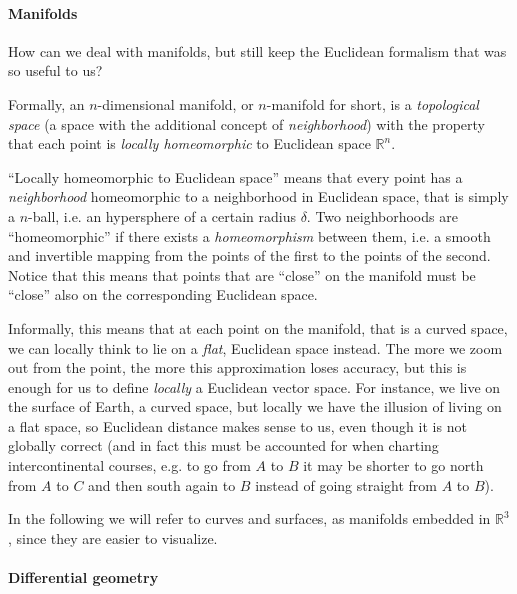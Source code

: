 \paragraph{Manifolds}

How can we deal with manifolds, but still keep the Euclidean formalism that was so useful to us? 

Formally, an $n$-dimensional manifold, or $n$-manifold for short, is a \emph{topological space} (a space with the additional concept of \emph{neighborhood}) with the property that each point is \emph{locally homeomorphic} to Euclidean space $\mathbb{R}^n$. 

``Locally homeomorphic to Euclidean space'' means that every point has a \emph{neighborhood} homeomorphic to a neighborhood in Euclidean space, that is simply a $n$-ball, i.e. an hypersphere of a certain radius $\delta$. 
Two neighborhoods are ``homeomorphic'' if there exists a \emph{homeomorphism} between them, i.e. a smooth and invertible mapping from the points of the first to the points of the second. Notice that this means that points that are ``close'' on the manifold must be ``close'' also on the corresponding Euclidean space.

Informally, this means that at each point on the manifold, that is a curved space, we can locally think to lie on a \emph{flat}, Euclidean space instead. The more we zoom out from the point, the more this approximation loses accuracy, but this is enough for us to define \emph{locally} a Euclidean vector space. For instance, we live on the surface of Earth, a curved space, but locally we have the illusion of living on a flat space, so Euclidean distance makes sense to us, even though it is not globally correct (and in fact this must be accounted for when charting intercontinental courses, e.g. to go from $A$ to $B$ it may be shorter to go north from $A$ to $C$ and then south again to $B$ instead of going straight from $A$ to $B$).

In the following we will refer to curves and surfaces, as manifolds embedded in $\mathbb{R}^3$, since they are easier to visualize.

\paragraph{Differential geometry}

